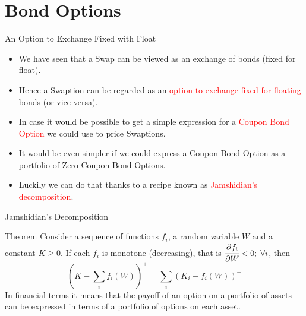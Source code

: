 \documentclass{beamer}
\begin{document}
\section{Bond Options}
\begin{frame}{An Option to Exchange Fixed with Float}
\begin{itemize}
	\item<1-> We have seen that a Swap can be viewed as an exchange of bonds (fixed for float).
	\item<1-> Hence a Swaption can be regarded as an \textcolor{red}{option to exchange fixed for floating} bonds (or vice versa).
	\item<2-> In case it would be possible to get a simple expression for a \textcolor{red}{Coupon Bond Option} we could use to price Swaptions.
	\item <2-> It would be even simpler if we could express a Coupon Bond Option as a portfolio of Zero Coupon Bond Options.
	\item<3-> Luckily we can do that thanks to a recipe known as \textcolor{red}{Jamshidian's decomposition}.
\end{itemize}
\end{frame}

\begin{frame}{Jamshidian's Decomposition}
\begin{block}{Theorem}
	Consider a sequence of functions $f_i$, a random variable $W$ and a constant $K\ge0$. If each $f_i$ is monotone (decreasing), that is $\cfrac{\partial f_i}{\partial W} < 0;\;\forall i$, then 
	\begin{equation*}
		\left(K - \sum_i f_i(W)\right)^+ = 	\sum_i \left(K_i - f_i(W)\right)^+
	\end{equation*} 
	In financial terms it means that the payoff of an option on a portfolio of assets can be expressed in terms of a portfolio of options on each asset.
\end{block}
\end{frame}
\end{document}
